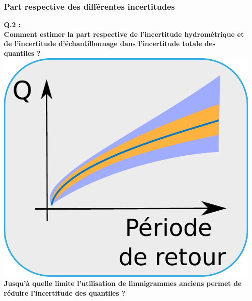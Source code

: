 \documentclass[compress,9pt]{beamer}
\begin{document}
	                
	\begin{frame}
		\frametitle{Part respective des différentes incertitudes}
		\centering
		\vfill
		\Large{\textbf{Q.2 :\\
		\vfill
		Comment estimer la part respective de l'incertitude hydrométrique et de l'incertitude d'échantillonnage dans l'incertitude totale des quantiles ? \\
		\vfill
			\includegraphics[width = .2\textwidth]{./Figures/uHuE.pdf}
		\vfill
		Jusqu'à quelle limite l'utilisation de limnigrammes anciens permet de réduire l'incertitude des quantiles ?} }%
		\vfill
	\end{frame}
	
\end{document}
